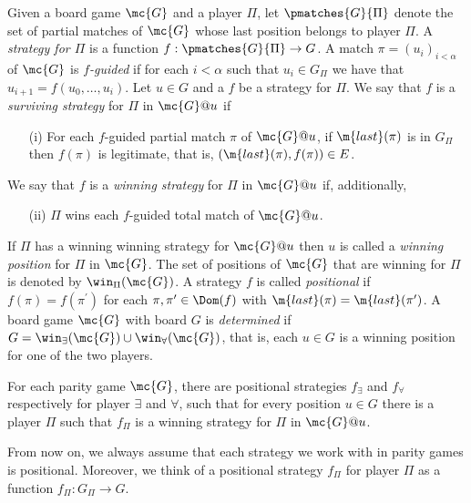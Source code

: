 Given a board game $\mc{G}$ and a player $\Pi$, let $\pmatches{G}{\Pi}$ denote
the set of partial matches of $\mc{G}$ whose last position belongs to player
$\Pi$.
A \emph{strategy for $\Pi$} is a function $f:\pmatches{G}{\Pi}\to G$.
A match $\pi  = (u_i)_{i< \alpha}$ of $\mc{G}$ is
\emph{$f$-guided} if for each $i < \alpha$ such that $u_i \in G_{\Pi}$ we
have that $u_{i+1} = f(u_0,\dots,u_i)$.
%
Let $u \in G$ and a $f$ be a strategy for $\Pi$.
We say that $f$ is a \emph{surviving strategy} for $\Pi$ in $\mc{G}@u$ if
%
\begin{enumerate}
  \item[(i)] For each $f$-guided partial match $\pi$ of $\mc{G}@u$, if $\m{last}(\pi)$
  is in $G_{\Pi}$ then $f(\pi)$ is legitimate, that is,
  $(\m{last}(\pi),f(\pi)) \in E$.
\end{enumerate}
%
We say that $f$ is a \emph{winning strategy} for $\Pi$ in $\mc{G}@u$ if, additionally, %
%
\begin{enumerate}
  \item[(ii)] $\Pi$ wins each $f$-guided total match of $\mc{G}@u$.
\end{enumerate}
%
If $\Pi$ has a winning winning strategy for $\mc{G}@u$ then $u$ is called a \emph{winning position} for $\Pi$ in $\mc{G}$.
The set of positions of $\mc{G}$ that are winning for $\Pi$ is denoted by $\win_{\Pi}(\mc{G})$.
A strategy $f$ is called \emph{positional} if $f(\pi) = f(\pi^{\prime})$ for each $\pi,\pi^{\prime} \in \Dom(f)$ with $\m{last}(\pi) = \m{last}(\pi^{\prime})$.
A board game $\mc{G}$ with board $G$ is \emph{determined} if $G = \win_{\exists}(\mc{G}) \cup \win_{\forall}(\mc{G})$, that is, each $u \in G$ is a winning position for one of the two players.

\begin{fact}
\label{THM_posDet_ParityGames}
For each parity game $\mc{G}$, there are positional strategies $f_{\exists}$
and $f_{\forall}$ respectively for player $\exists$ and $\forall$, such that
for every position $u \in G$ there is a player $\Pi$ such that $f_{\Pi}$ is a
winning strategy for $\Pi$ in $\mc{G}@u$.
\end{fact}
%
From now on, we always assume that each strategy we work with in parity games
is positional. Moreover, we think of a positional strategy $f_\Pi$ for player $\Pi$
as a function $f_\Pi:G_\Pi\to G$.